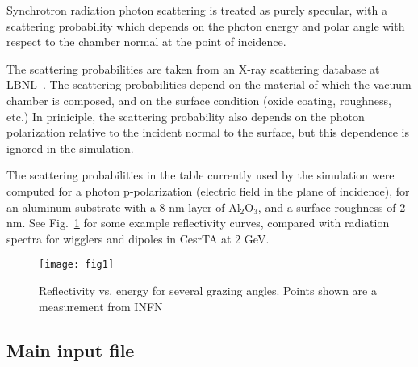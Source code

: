 \documentclass[11pt,landscape]{article}
\begin{document}
Synchrotron radiation
photon scattering is treated as purely specular, with a scattering
probability which depends on the photon energy and polar angle with
respect to the chamber normal at the point of incidence.

The scattering probabilities are taken from an X-ray scattering
database at LBNL~\cite{ref:1}. The scattering probabilities depend on
the material of which the vacuum chamber is composed, and on the
surface condition (oxide coating, roughness, etc.) In priniciple, the
scattering probability also depends on the photon polarization
relative to the incident normal to the surface, but this dependence is
ignored in the simulation.

The scattering probabilities in the table currently used by the
simulation were computed for a photon p-polarization (electric field
in the plane of incidence), for an aluminum substrate with a 8 nm
layer of Al$_2$O$_3$, and a surface roughness of 2 nm. See
Fig.~\ref{f1} for some example reflectivity curves, compared with
radiation spectra for wigglers and dipoles in CesrTA at 2 GeV.

\begin{figure}[h!]
\begin{center}
\texttt{[image: fig1]}
\caption{Reflectivity vs. energy for several grazing angles. 
Points shown are a measurement from INFN~\cite{ref:2}}
\label{f1}
\end{center}
\end{figure}

\subsection{Main input file} 
\end{document}
